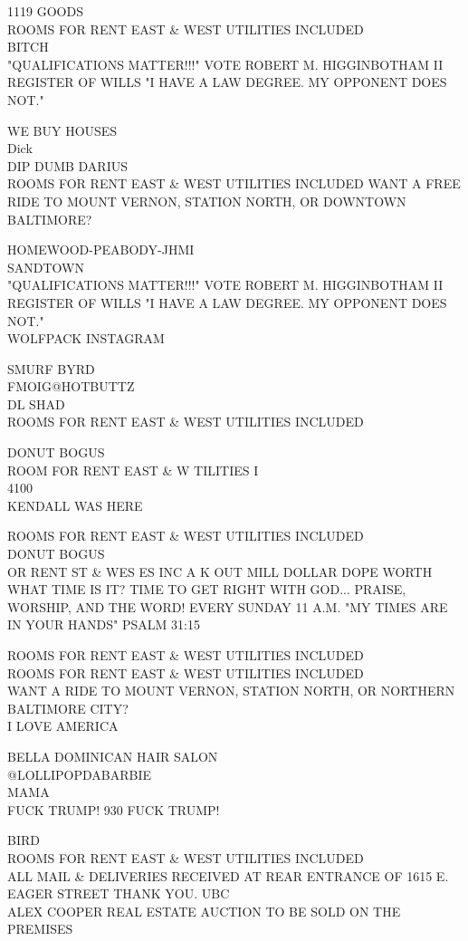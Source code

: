 \documentclass[10pt,letterpaper]{article}
\begin{document}
1119 GOODS\\
ROOMS FOR RENT EAST \& WEST UTILITIES INCLUDED\\
BITCH\\
"QUALIFICATIONS MATTER!!!" VOTE ROBERT M. HIGGINBOTHAM II REGISTER OF WILLS "I HAVE A LAW DEGREE.  MY OPPONENT DOES NOT."

WE BUY HOUSES\\
Dick\\
DIP DUMB DARIUS\\
ROOMS FOR RENT EAST \& WEST UTILITIES INCLUDED WANT A FREE RIDE TO MOUNT VERNON, STATION NORTH, OR DOWNTOWN BALTIMORE?

HOMEWOOD{-}PEABODY{-}JHMI\\
SANDTOWN\\
"QUALIFICATIONS MATTER!!!" VOTE ROBERT M. HIGGINBOTHAM II REGISTER OF WILLS "I HAVE A LAW DEGREE.  MY OPPONENT DOES NOT."\\
WOLFPACK INSTAGRAM

SMURF BYRD\\
FMOIG@HOTBUTTZ\\
DL SHAD\\
ROOMS FOR RENT EAST \& WEST UTILITIES INCLUDED

DONUT BOGUS\\
ROOM FOR RENT EAST \& W TILITIES I\\
4100\\
KENDALL WAS HERE

ROOMS FOR RENT EAST \& WEST UTILITIES INCLUDED\\
DONUT BOGUS\\
OR RENT ST \& WES ES INC A K OUT MILL DOLLAR DOPE WORTH\\
WHAT TIME IS IT?  TIME TO GET RIGHT WITH GOD... PRAISE, WORSHIP, AND THE WORD!  EVERY SUNDAY 11 A.M.  "MY TIMES ARE IN YOUR HANDS" PSALM 31:15

ROOMS FOR RENT EAST \& WEST UTILITIES INCLUDED\\
ROOMS FOR RENT EAST \& WEST UTILITIES INCLUDED\\
WANT A RIDE TO MOUNT VERNON, STATION NORTH, OR NORTHERN BALTIMORE CITY?\\
I LOVE AMERICA

BELLA DOMINICAN HAIR SALON\\
@LOLLIPOPDABARBIE\\
MAMA\\
FUCK TRUMP!  930 FUCK TRUMP!

BIRD\\
ROOMS FOR RENT EAST \& WEST UTILITIES INCLUDED\\
ALL MAIL \& DELIVERIES RECEIVED AT REAR ENTRANCE OF 1615 E. EAGER STREET THANK YOU. UBC\\
ALEX COOPER REAL ESTATE AUCTION TO BE SOLD ON THE PREMISES
\end{document}

